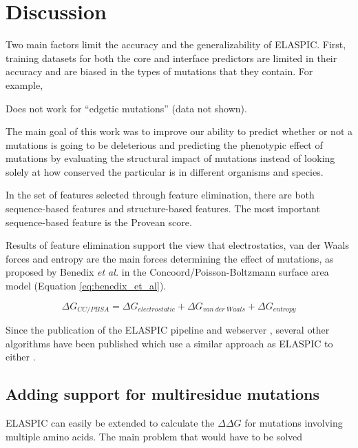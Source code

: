
\chapter{Discussion} \label{ch:discussion}

Two main factors limit the accuracy and the generalizability of ELASPIC. First, training datasets for both the core and interface predictors are limited in their accuracy and are biased in the types of mutations that they contain. For example,

Does not work for ``edgetic mutations'' (data not shown).

The main goal of this work was to improve our ability to predict whether or not a mutations is going to be deleterious and predicting the phenotypic effect of mutations by evaluating the structural impact of mutations instead of looking solely at how conserved the particular is in different organisms and species.

In the set of features selected through feature elimination, there are both sequence-based features and structure-based features. The most important sequence-based feature is the Provean score.

Results of feature elimination support the view that electrostatics, van der Waals forces and entropy are the main forces determining the effect of mutations, as proposed by Benedix \textit{et al.} in the Concoord/Poisson-Boltzmann surface area model (Equation \ref{eq:benedix_et_al}).

\begin{equation} \label{eq:benedix_et_al}
    \Delta G_{CC/PBSA} = \Delta G_{electrostatic} + \Delta G_{van\ der\ Waals} + \Delta G_{entropy}
\end{equation}

Since the publication of the ELASPIC pipeline \cite{berliner_combining_2014} and webserver \cite{witvliet_elaspic_2016}, several other algorithms have been published which use a similar approach as ELASPIC to either .



\section{Adding support for multiresidue mutations}

ELASPIC can easily be extended to calculate the $\Delta \Delta G$ for mutations involving multiple amino acids. The main problem that would have to be solved

